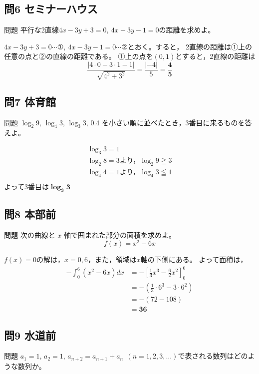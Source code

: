 \documentclass[a5paper]{ltjsarticle}
\begin{document}
\subsection*{問6 セミナーハウス}
\begin{itembox}[l]{問題}
  平行な2直線$4x-3y+3=0,\: 4x-3y-1=0$の距離を求めよ。
\end{itembox}

$4x-3y+3=0\cdots \text{①},\:4x-3y-1=0\cdots \text{②}$とおく。すると，%
2直線の距離は①上の任意の点と②の直線の距離である。
①上の点を$ (0,1)$とすると，2直線の距離は
\[\frac{|4\cdot 0 - 3\cdot 1 -1|}{\sqrt{4^2+3^2}}=\frac{|-4|}{5}=\mathbf{\frac{4}{5}}\]


\subsection*{問7 体育館}
\begin{itembox}[l]{問題}
  $ \log_2 9,\, \log_4 3,\, \log_3 3,\, 0.4$ を小さい順に並べたとき，3番目に来るものを答えよ。
\end{itembox}

\begin{align*}
  \log_3 3=1\\
  \log_2 8=3\text{より，}\log_2 9 \geqq 3\\
  \log_4 4=1\text{より，}\log_4 3 \leqq 1\\
\end{align*}
よって3番目は\qquad$\bm{\log_3 3}$


\subsection*{問8 本部前}
\begin{itembox}[l]{問題}
  次の曲線と $ x$ 軸で囲まれた部分の面積を求めよ。
      \[ f(x)=x^2-6x\]
\end{itembox}

$f (x)=0$の解は，$x=0,6$，また，領域は$x$軸の下側にある。
よって面積は，
\begin{align*}
  -\int_0^6 (x^2-6x) dx&=-{\left[\frac{1}{3}x^3-\frac{6}{2}x^2\right]}_0^6\\
  &=-\left(\frac{1}{3}\cdot 6^3 - 3\cdot 6^2\right)\\
  &=-(72-108)\\
  &=\mathbf{36}
\end{align*}


\subsection*{問9 水道前}
\begin{itembox}[l]{問題}
  $ a_1 =1,\, a_2 =1,\, a_{n+2}=a_{n+1}+a_n\:\: (n=1,2,3,\ldots ) $で表される数列はどのような数列か。
\end{itembox}
\end{document}
